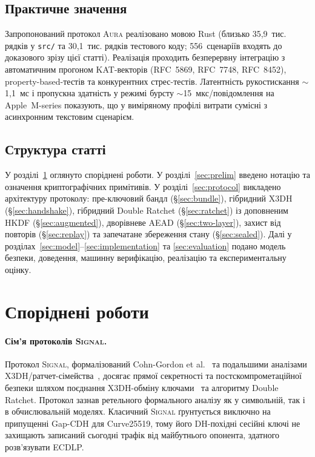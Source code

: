 \documentclass[11pt,a4paper]{article}
\theoremstyle{definition}
\newcommand{\GapCDH}{\textsf{Gap-CDH}}
\newcommand{\Aura}{\mbox{\normalfont\scshape Aura}}
\newcommand{\Signal}{\mbox{\normalfont\scshape Signal}}
\begin{document}
\subsection{Практичне значення}\label{sec:practical}

Запропонований протокол \Aura{} реалізовано мовою Rust (близько
35{,}9~тис. рядків у \texttt{src/} та 30{,}1~тис. рядків тестового коду;
556~сценаріїв входять до доказового зрізу цієї статті).
Реалізація проходить безперервну інтеграцію з
автоматичним прогоном KAT-векторів (RFC~5869, RFC~7748, RFC~8452),
property-based-тестів та конкурентних стрес-тестів. Латентність
рукостискання $\sim$1{,}1~мс і пропускна здатність у режимі
бурсту $\sim$15~мкс/повідомлення на Apple~M-series показують, що у
виміряному профілі витрати сумісні з асинхронним текстовим сценарієм.

\subsection{Структура статті}\label{sec:structure}

У розділі~\ref{sec:related} оглянуто споріднені роботи. У
розділі~\ref{sec:prelim} введено нотацію та означення криптографічних
примітивів. У розділі~\ref{sec:protocol} викладено архітектуру
протоколу: пре-ключовий бандл (\S\ref{sec:bundle}), гібридний X3DH
(\S\ref{sec:handshake}), гібридний Double Ratchet (\S\ref{sec:ratchet})
із доповненим HKDF (\S\ref{sec:augmented}), дворівневе AEAD
(\S\ref{sec:two-layer}), захист від повторів (\S\ref{sec:replay}) та
запечатане збереження стану (\S\ref{sec:sealed}).
Далі у розділах~\ref{sec:model}--\ref{sec:implementation} та
\ref{sec:evaluation} подано модель безпеки, доведення, машинну
верифікацію, реалізацію та експериментальну оцінку.

\section{Споріднені роботи}\label{sec:related}

\paragraph{Сім'я протоколів \Signal{}.}
Протокол \Signal{}, формалізований Cohn-Gordon et al.~\cite{cohn-gordon2020}
та подальшими аналізами X3DH/ратчет-сімейства~\cite{brendel2020,hashimoto2021},
досягає прямої секретності та постскомпрометаційної безпеки шляхом поєднання
X3DH-обміну ключами~\cite{signal-x3dh} та алгоритму Double Ratchet. Протокол
зазнав ретельного формального аналізу як у символьній, так і в обчислювальній
моделях. Класичний \Signal{} ґрунтується виключно на припущенні \GapCDH{}
для Curve25519, тому його DH-похідні сесійні ключі не захищають записаний
сьогодні трафік від майбутнього опонента, здатного розв'язувати ECDLP.
\end{document}
